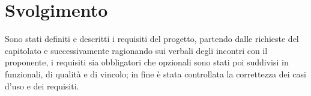 \section{Svolgimento}

Sono stati definiti e descritti i requisiti del progetto, partendo dalle richieste del capitolato e successivamente ragionando sui verbali degli incontri con il proponente, i requisiti sia obbligatori che opzionali sono stati poi suddivisi in funzionali, di qualità e di vincolo; in fine è stata controllata la correttezza dei casi d'uso e dei requisiti.